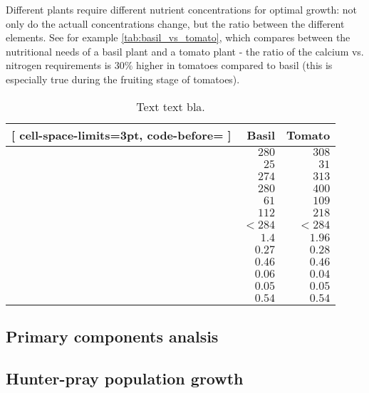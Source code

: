 Different plants require different nutrient concentrations for optimal growth: not only do the actuall concentrations change, but the ratio between the different elements. See for example \autoref{tab:basil_vs_tomato}, which compares between the nutritional needs of a basil plant and a tomato plant - the ratio of the calcium vs. nitrogen requirements is $30\%$ higher in tomatoes compared to basil (this is especially true during the fruiting stage of tomatoes).

\begin{table}[htpb]
	\centering
	\caption{Text text bla.}
	\label{tab:basil_vs_tomato}
	\begin{NiceTabular}{lrr}[
			cell-space-limits=3pt, code-before= 
		]
		\toprule
		\RowStyle{\bfseries} & Basil & Tomato \\
		\midrule
		  & $ 280$ & $ 308$ \\
		  & $  25$ & $  31$ \\
		  & $ 274$ & $ 313$ \\
		 & $ 280$ & $ 400$ \\
		 & $  61$ & $ 109$ \\
		  & $ 112$ & $ 218$ \\
		 & $<284$ & $<284$ \\
		 & $ 1.4$ & $1.96$ \\
		 & $0.27$ & $0.28$ \\
		 & $0.46$ & $0.46$ \\
		 & $0.06$ & $0.04$ \\
		 & $0.05$ & $0.05$ \\
		  & $0.54$ & $0.54$ \\
		\bottomrule
	\end{NiceTabular}
\end{table}



\subsection{Primary components analsis}

\subsection{Hunter-pray population growth}
